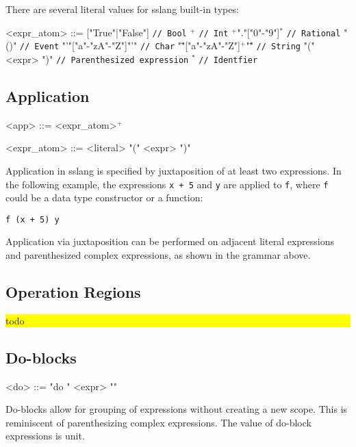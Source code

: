 \documentclass{article}
\newcommand{\fixme}[1]{
  \noindent\colorbox{yellow}{\parbox{\dimexpr\linewidth-2\fboxsep}{#1}}%
}
\begin{document}
There are several literal values for sslang built-in types:

\begin{grammar}
<expr_atom> ::= ["True"|"False"] \texttt{// Bool}
\alt ["0"-"9"]$^{+}$ \texttt{// Int}
\alt ["0"-"9"]$^{+}$"."["0"-"9"]$^{*}$ \texttt{// Rational}
\alt "()" \texttt{// Event}
\alt "'"["a"-"zA"-"Z"]"'" \texttt{// Char}
\alt "\""["a"-"zA"-"Z"]$^{+}$"\"" \texttt{// String}
\alt "(" <expr> ")" \texttt{// Parenthesized expression}
\alt ["a"-"zA"-"Z"] ["a"-"zA"-"Z0"-"9_'"]$^{*}$ \texttt{// Identfier}
\end{grammar}
\subsection{Application}
\begin{grammar}
<app> ::= <expr_atom>$^{+}$

<expr_atom> ::= <literal>
\alt "(" <expr> ")"
\end{grammar}

Application in sslang is specified by juxtaposition of at least two expressions. In the following example, the expressions \texttt{x + 5} and \texttt{y} are applied to \texttt{f}, where \texttt{f} could be a data type constructor or a function:
\begin{lstlisting}
f (x + 5) y
\end{lstlisting}

Application via juxtaposition can be performed on adjacent literal expressions and parenthesized complex expressions, as shown in the grammar above.

\subsection{Operation Regions}
\fixme{todo}
\subsection{Do-blocks}
\begin{grammar}
<do> ::= "do {" <expr> "}"
\end{grammar}
Do-blocks allow for grouping of expressions without creating a new scope. This is reminiscent of parenthesizing complex expressions.
The value of do-block expressions is unit.
\end{document}
